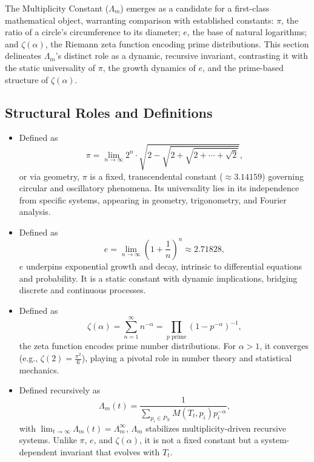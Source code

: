 \documentclass{article}
\theoremstyle{plain}
\begin{document}
The Multiplicity Constant (\(\Lambda_m\)) emerges as a candidate for a first-class mathematical object, warranting comparison with established constants: \(\pi\), the ratio of a circle's circumference to its diameter; \(e\), the base of natural logarithms; and \(\zeta(\alpha)\), the Riemann zeta function encoding prime distributions. This section delineates \(\Lambda_m\)'s distinct role as a dynamic, recursive invariant, contrasting it with the static universality of \(\pi\), the growth dynamics of \(e\), and the prime-based structure of \(\zeta(\alpha)\).

\subsection{Structural Roles and Definitions}

\begin{itemize}
    \item[\textbf{\(\pi\)}] Defined as 
    \[
    \pi = \lim_{n \to \infty} 2^n \cdot \sqrt{2 - \sqrt{2 + \sqrt{2 + \cdots + \sqrt{2}}}},
    \]
    or via geometry, \(\pi\) is a fixed, transcendental constant (\(\approx 3.14159\)) governing circular and oscillatory phenomena. Its universality lies in its independence from specific systems, appearing in geometry, trigonometry, and Fourier analysis.

    \item[\textbf{\(e\)}] Defined as 
    \[
    e = \lim_{n \to \infty} \left(1 + \frac{1}{n}\right)^n \approx 2.71828,
    \]
    \(e\) underpins exponential growth and decay, intrinsic to differential equations and probability. It is a static constant with dynamic implications, bridging discrete and continuous processes.

    \item[\textbf{\(\zeta(\alpha)\)}] Defined as 
    \[
    \zeta(\alpha) = \sum_{n=1}^\infty n^{-\alpha} = \prod_{p \text{ prime}} (1 - p^{-\alpha})^{-1},
    \]
    the zeta function encodes prime number distributions. For \(\alpha > 1\), it converges (e.g., \(\zeta(2) = \frac{\pi^2}{6}\)), playing a pivotal role in number theory and statistical mechanics.

    \item[\textbf{\(\Lambda_m\)}] Defined recursively as 
    \[
    \Lambda_m(t) = \frac{1}{\sum_{p_i \in P_N} M(T_t, p_i) p_i^{-\alpha}},
    \]
    with \(\lim_{t \to \infty} \Lambda_m(t) = \Lambda_m^\infty\), \(\Lambda_m\) stabilizes multiplicity-driven recursive systems. Unlike \(\pi\), \(e\), and \(\zeta(\alpha)\), it is not a fixed constant but a system-dependent invariant that evolves with \(T_t\).
\end{itemize}
\end{document}
